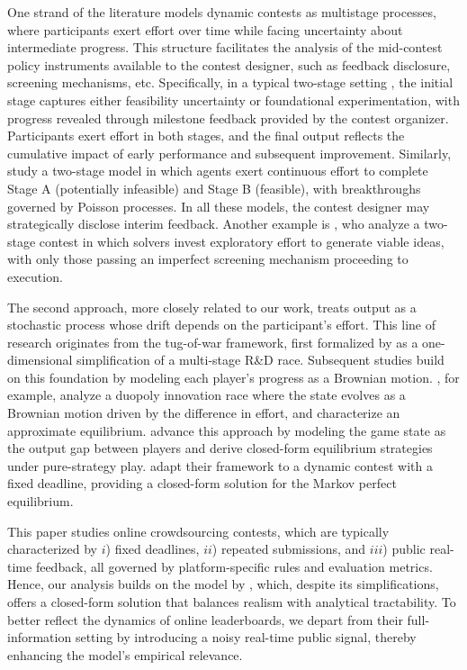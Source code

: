 \documentclass[mnsc]{informs3}
\begin{document}
One strand of the literature models dynamic contests as multistage processes, where participants exert effort over time while facing uncertainty about intermediate progress.
This structure facilitates the analysis of the mid-contest policy instruments available to the contest designer, such as feedback disclosure, screening mechanisms, etc.
Specifically, in a typical two-stage setting \citep{aoyagi2010information, mihm2019feedback}, the initial stage captures either feasibility uncertainty or foundational experimentation, with progress revealed through milestone feedback provided by the contest organizer. 
Participants exert effort in both stages, and the final output reflects the cumulative impact of early performance and subsequent improvement.
Similarly, \citet{Bimpikis2019Contest} study a two-stage model in which agents exert continuous effort to complete Stage A (potentially infeasible) and Stage B (feasible), with breakthroughs governed by Poisson processes.
In all these models, the contest designer may strategically disclose interim feedback.
Another example is \citet{Khorasani2023screening}, who analyze a two-stage contest in which solvers invest exploratory effort to generate viable ideas, with only those passing an imperfect screening mechanism proceeding to execution.

The second approach, more closely related to our work, treats output as a stochastic process whose drift depends on the participant’s effort.
This line of research originates from the tug-of-war framework, first formalized by \citet{Harris1987Race} as a one-dimensional simplification of a multi-stage R\&D race.
Subsequent studies build on this foundation by modeling each player’s progress as a Brownian motion.
\citet{budd1993model}, for example, analyze a duopoly innovation race where the state evolves as a Brownian motion driven by the difference in effort, and characterize an approximate equilibrium.
\citet{Moscarini2011Contest} advance this approach by modeling the game state as the output gap between players and derive closed-form equilibrium strategies under pure-strategy play.
\citet{ryvkin2022fight} adapt their framework to a dynamic contest with a fixed deadline, providing a closed-form solution for the Markov perfect equilibrium.


This paper studies online crowdsourcing contests, which are typically characterized by 
$i$) fixed deadlines, 
$ii$) repeated submissions, and 
$iii$) public real-time feedback,
all governed by platform-specific rules and evaluation metrics.
Hence, our analysis builds on the model by \citet{ryvkin2022fight}, which, despite its simplifications, offers a closed-form solution that balances realism with analytical tractability. 
To better reflect the dynamics of online leaderboards, we depart from their full-information setting by introducing a noisy real-time public signal, thereby enhancing the model’s empirical relevance.
\end{document}
